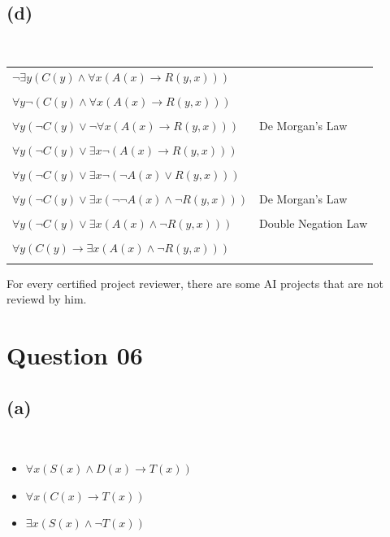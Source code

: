 \documentclass[a4paper,12pt]{article}
\begin{document}
\subsection{(d)}
\,\\
\begin{tabular}{ll}
    $\neg \exists y (C(y) \land \forall x(A(x) \rightarrow R(y,x)))$ & \\\\
    $\forall y \neg (C(y) \land \forall x(A(x) \rightarrow R(y,x)))$ & \\\\
    $\forall y (\neg C(y) \lor \neg \forall x(A(x) \rightarrow R(y,x)))$ & De Morgan's Law\\\\
    $\forall y (\neg C(y) \lor \exists x \neg (A(x) \rightarrow R(y,x)))$ &\\\\
    $\forall y (\neg C(y) \lor \exists x \neg (\neg A(x) \lor R(y,x)))$ &\\\\
    $\forall y (\neg C(y) \lor \exists x (\neg \neg A(x) \land \neg R(y,x)))$ & De Morgan's Law\\\\
    $\forall y (\neg C(y) \lor \exists x (A(x) \land \neg R(y,x)))$ & Double Negation Law\\\\
    $\forall y (C(y) \rightarrow \exists x (A(x) \land \neg R(y,x)))$ &\\\\
\end{tabular}

For every certified project reviewer, there are some AI projects that are not reviewd by him.

\newpage
\section{Question 06}
\subsection{(a)}
\,\\
\begin{itemize}
    \item[( 1 )]$\forall x(S(x) \land D(x) \rightarrow T(x))$
    \item[( 2 )]$\forall x(C(x) \rightarrow T(x))$
    \item[( 3 )]$\exists x(S(x) \land \neg T(x))$
\end{itemize}
\end{document}
